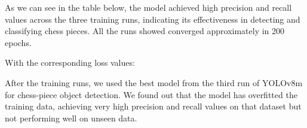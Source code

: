 As we can see in the table below, the model achieved high precision
 and recall values across the three training runs,
indicating its effectiveness in detecting and classifying chess pieces.
All the runs showed converged approximately in 200 epochs.

\begin{table}[ht]
\centering
\caption{Key performance metrics for the three YOLOv8m training runs.}
\label{tab:YOLOv8-results}
\end{table}

With the corresponding loss values:
\begin{table}[ht]
\centering
\caption{Loss values for the three YOLOv8m runs. All values are approximate and taken at convergence (step $\sim$200).}
\label{tab:yolov8-loss}
\end{table}

After the training runs, we used the best model from the third run of YOLOv8m for chess-piece object detection.
We found out that the model has overfitted the training data, achieving very high precision and recall values on that dataset but not performing well on unseen data.

